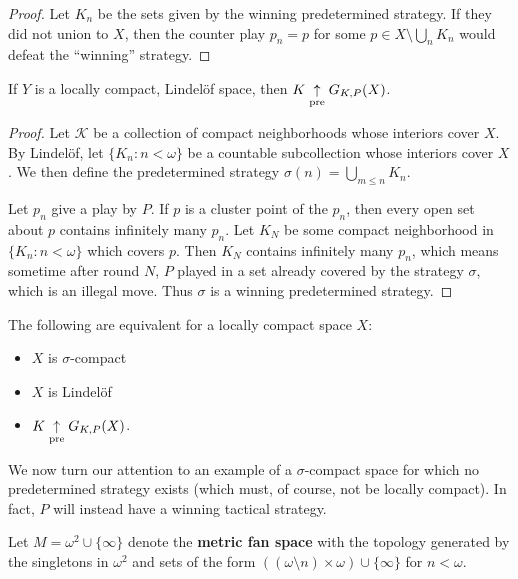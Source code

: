 \begin{proof}
Let $K_n$ be the sets given by the winning predetermined strategy. If they did not union to $X$, then the counter play $p_n=p$ for some $p\in X\setminus \bigcup_n K_n$ would defeat the ``winning'' strategy.
\end{proof}

\begin{theorem}
If $Y$ is a locally compact, Lindel\"of space, then $K \underset{\text{pre}}{\uparrow} G_{K,P}(X)$.
\end{theorem}

\begin{proof}
Let $\mathcal{K}$ be a collection of compact neighborhoods whose interiors cover $X$. By Lindel\"of, let $\{K_n : n<\omega\}$ be a countable subcollection whose interiors cover $X$. We then define the predetermined strategy $\sigma(n)=\bigcup_{m\leq n} K_n$.

Let $p_n$ give a play by $P$. If $p$ is a cluster point of the $p_n$, then every open set about $p$ contains infinitely many $p_n$. Let $K_N$ be some compact neighborhood in $\{K_n : n<\omega\}$ which covers $p$. Then $K_N$ contains infinitely many $p_n$, which means sometime after round $N$, $P$ played in a set already covered by the strategy $\sigma$, which is an illegal move. Thus $\sigma$ is a winning predetermined strategy.
\end{proof}

\begin{corollary}
The following are equivalent for a locally compact space $X$:
    \begin{itemize}
    \item $X$ is $\sigma$-compact
    \item $X$ is Lindel\"of
    \item $K \underset{\text{pre}}{\uparrow} G_{K,P}(X)$.
    \end{itemize}
\end{corollary}

We now turn our attention to an example of a $\sigma$-compact space for which no predetermined strategy exists (which must, of course, not be locally compact). In fact, $P$ will instead have a winning tactical strategy.

\begin{definition}
Let $M=\omega^2\cup\{\infty\}$ denote the \textbf{metric fan space} with the topology generated by the singletons in $\omega^2$ and sets of the form $((\omega\setminus n)\times\omega) \cup \{\infty\}$ for $n<\omega$.
\end{definition}

